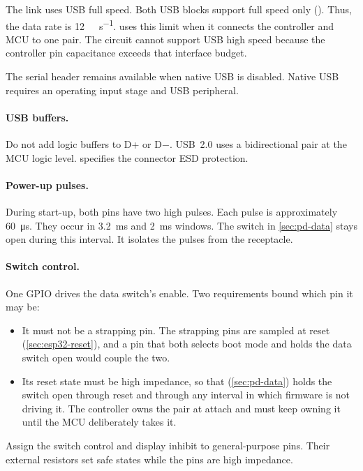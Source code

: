 The link uses USB full speed. Both USB blocks support full speed only
(). Thus, the data rate
is \SI{12}{\mega\bit\per\second}.  uses this limit when it
connects the controller and MCU to one pair. The circuit cannot support USB high
speed because the controller pin capacitance exceeds that interface budget.

The serial header remains available when native USB is disabled. Native USB
requires an operating input stage and USB peripheral.

\paragraph{USB buffers.} Do not add logic buffers to D+ or D$-$. USB~2.0 uses
a bidirectional pair at the MCU logic level.  specifies the
connector ESD protection.

\paragraph{Power-up pulses.} During start-up, both pins have two high pulses.
Each pulse is approximately \SI{60}{\micro\second}. They occur in
\SI{3.2}{\milli\second} and \SI{2}{\milli\second} windows. The switch in
\cref{sec:pd-data} stays open during this interval. It isolates the pulses from
the receptacle.

\paragraph{Switch control.} One GPIO drives the data switch's enable. Two
requirements bound which pin it may be:
\begin{itemize}[nosep]
  \item It must not be a strapping pin. The strapping pins are sampled at reset
    (\cref{sec:esp32-reset}), and a pin that both selects boot mode and holds
    the data switch open would couple the two.
  \item Its reset state must be high impedance, so that 
    (\cref{sec:pd-data}) holds the switch open through reset and through any
    interval in which firmware is not driving it. The controller owns the pair
    at attach and must keep owning it until the MCU deliberately takes it.
\end{itemize}
Assign the switch control and display inhibit to general-purpose pins. Their
external resistors set safe states while the pins are high impedance.

